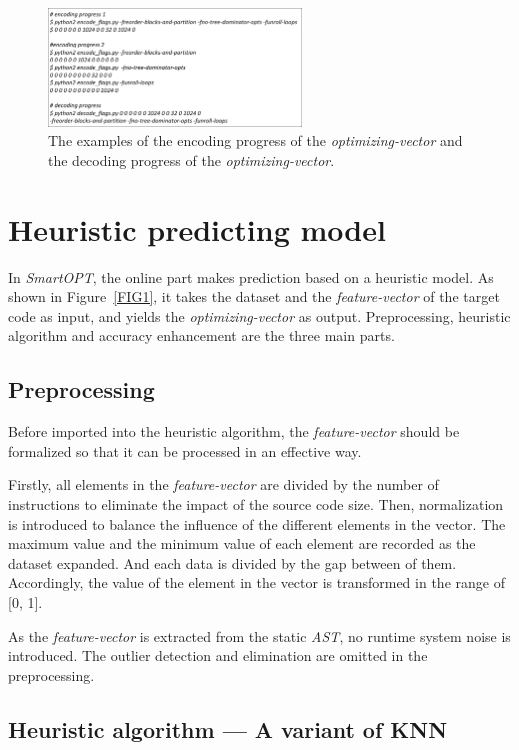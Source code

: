 \documentclass[bst/sn-mathphys]{sn-jnl}%
\theoremstyle{thmstyleone}%
\theoremstyle{thmstyletwo}%
\theoremstyle{thmstylethree}%
\begin{document}
\begin{figure}[h]%
\centering
\includegraphics[width=0.6\textwidth]{fig/fig4.pdf}
\caption{The examples of the encoding progress of the \emph{optimizing-vector} 
and the decoding progress of the \emph{optimizing-vector}.}\label{FIG4}
\end{figure}

\section{Heuristic predicting model}\label{sec5}

In \emph{SmartOPT}, the online part makes prediction based on a heuristic 
model. As shown in Figure~\ref{FIG1}, it takes the dataset and the 
\emph{feature-vector} of the target code as input, and yields the 
\emph{optimizing-vector} as output. Preprocessing, heuristic algorithm and 
accuracy enhancement are the three main parts.

\subsection{Preprocessing}\label{sec0501}

Before imported into the heuristic algorithm, the \emph{feature-vector} should 
be formalized so that it can be processed in an effective way.

Firstly, all elements in the \emph{feature-vector} are divided by the number 
of instructions to eliminate the impact of the source code size. Then, 
normalization is introduced to balance the influence of the different elements 
in the vector. The maximum value and the minimum value of each element are 
recorded as the dataset expanded. And each data is divided by the gap between 
of them. Accordingly, the value of the element in the vector is transformed in 
the range of [0, 1].

As the \emph{feature-vector} is extracted from the static \emph{AST}, no 
runtime system noise is introduced. The outlier detection and elimination are 
omitted in the preprocessing.

\subsection{Heuristic algorithm --- A variant of KNN}\label{sec0502}
\end{document}
